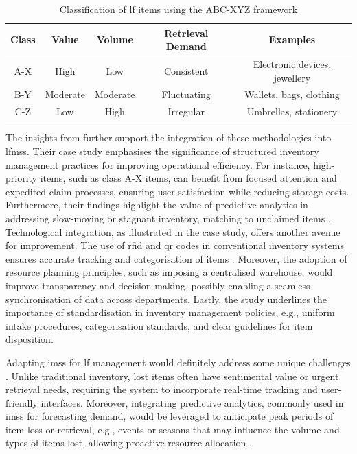 \begin{table}[H]
\centering
\caption{Classification of \ac{lf} items using the ABC-XYZ framework}
\begin{tabular}{|c|c|c|c|c|}
\hline
\textbf{Class} & \textbf{Value} & \textbf{Volume} & \textbf{Retrieval Demand} & \textbf{Examples} \\ 
\hline
A-X & High & Low & Consistent & Electronic devices, jewellery \\ 
\hline
B-Y & Moderate & Moderate & Fluctuating & Wallets, bags, clothing \\ 
\hline
C-Z & Low & High & Irregular & Umbrellas, stationery \\ 
\hline
\end{tabular}
\label{tab:abc_xyz}
\end{table}

The insights from  further support the integration of these methodologies into \acp{lfms}. Their case study emphasises the significance of structured inventory management practices for improving operational efficiency. For instance, high-priority items, such as class A-X items, can benefit from focused attention and expedited claim processes, ensuring user satisfaction while reducing storage costs. Furthermore, their findings highlight the value of predictive analytics in addressing slow-moving or stagnant inventory, matching to unclaimed items \cite{Plinere2016}. Technological integration, as illustrated in the case study, offers another avenue for improvement. The use of \ac{rfid} and \ac{qr} codes in conventional inventory systems ensures accurate tracking and categorisation of items \cite{Plinere2016, Sohail2018}. Moreover, the adoption of resource planning principles, such as imposing a centralised warehouse, would improve transparency and decision-making, possibly enabling a seamless synchronisation of data across departments. Lastly, the  study underlines the importance of standardisation in inventory management policies, e.g., uniform intake procedures, categorisation standards, and clear guidelines for item disposition.

Adapting \acp{ims} for \ac{lf} management would definitely address some unique challenges \cite{Pauliina2024}. Unlike traditional inventory, lost items often have sentimental value or urgent retrieval needs, requiring the system to incorporate real-time tracking and user-friendly interfaces. Moreover, integrating predictive analytics, commonly used in \acp{ims} for forecasting demand, would be leveraged to anticipate peak periods of item loss or retrieval, e.g., events or seasons that may influence the volume and types of items lost, allowing proactive resource allocation \cite{Prabakaran2023}.

